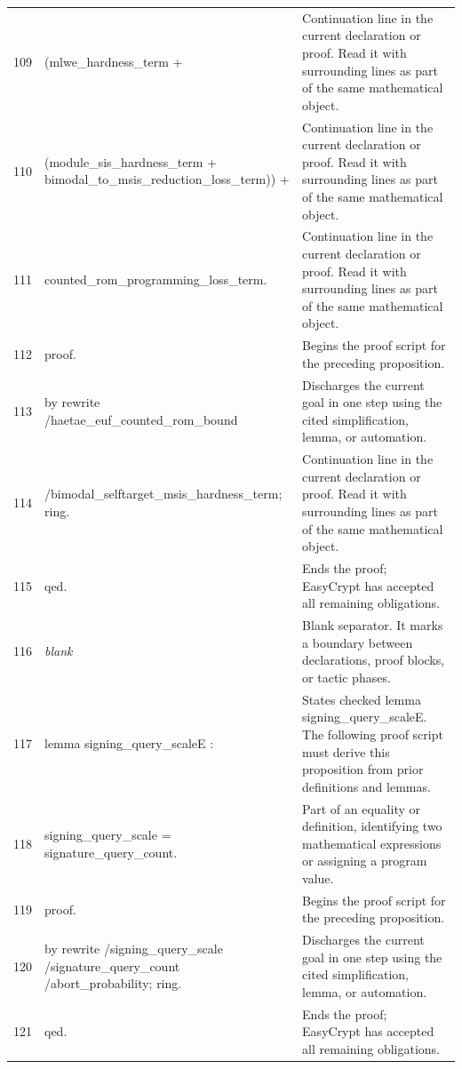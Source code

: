 \documentclass[10pt]{article}
\begin{document}
\begin{longtable}{r L{0.53\textwidth} L{0.37\textwidth}}
109 & {\ttfamily\scriptsize     (mlwe\_hardness\_term +} & Continuation line in the current declaration or proof.  Read it with surrounding lines as part of the same mathematical object. \\
110 & {\ttfamily\scriptsize       (module\_sis\_hardness\_term + bimodal\_to\_msis\_reduction\_loss\_term)) +} & Continuation line in the current declaration or proof.  Read it with surrounding lines as part of the same mathematical object. \\
111 & {\ttfamily\scriptsize     counted\_rom\_programming\_loss\_term.} & Continuation line in the current declaration or proof.  Read it with surrounding lines as part of the same mathematical object. \\
112 & {\ttfamily\scriptsize proof.} & Begins the proof script for the preceding proposition. \\
113 & {\ttfamily\scriptsize by rewrite /haetae\_euf\_counted\_rom\_bound} & Discharges the current goal in one step using the cited simplification, lemma, or automation. \\
114 & {\ttfamily\scriptsize            /bimodal\_selftarget\_msis\_hardness\_term; ring.} & Continuation line in the current declaration or proof.  Read it with surrounding lines as part of the same mathematical object. \\
115 & {\ttfamily\scriptsize qed.} & Ends the proof; EasyCrypt has accepted all remaining obligations. \\
116 & {\ttfamily\scriptsize \emph{blank}} & Blank separator.  It marks a boundary between declarations, proof blocks, or tactic phases. \\
117 & {\ttfamily\scriptsize lemma signing\_query\_scaleE :} & States checked lemma signing\_query\_scaleE.  The following proof script must derive this proposition from prior definitions and lemmas. \\
118 & {\ttfamily\scriptsize   signing\_query\_scale = signature\_query\_count.} & Part of an equality or definition, identifying two mathematical expressions or assigning a program value. \\
119 & {\ttfamily\scriptsize proof.} & Begins the proof script for the preceding proposition. \\
120 & {\ttfamily\scriptsize by rewrite /signing\_query\_scale /signature\_query\_count /abort\_probability; ring.} & Discharges the current goal in one step using the cited simplification, lemma, or automation. \\
121 & {\ttfamily\scriptsize qed.} & Ends the proof; EasyCrypt has accepted all remaining obligations. \\

\end{longtable}
\end{document}
